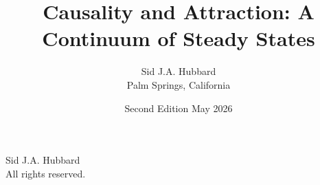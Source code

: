 \documentclass[11pt,oneside]{book}
\title{Causality and Attraction: A Continuum of Steady States}
\author{Sid J.A. Hubbard \\ Palm Springs, California}
\date{Second Edition \textendash May 2026}
\begin{document}
\maketitle

\begin{center}
 Sid J.A. Hubbard \\
All rights reserved.
\end{center}

\tableofcontents









\end{document}

